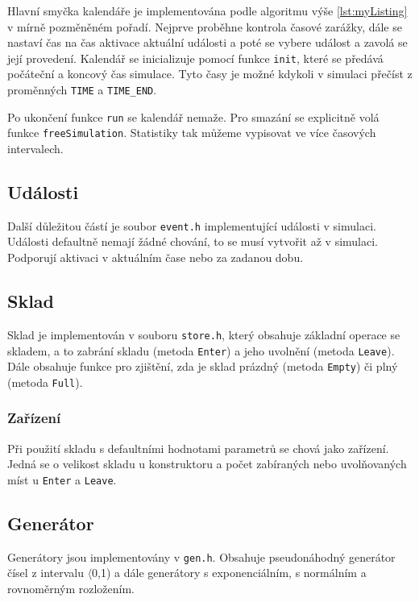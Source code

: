 \documentclass[12pt,a4paper,titlepage,final]{article}
\begin{document}
Hlavní smyčka kalendáře je implementována podle algoritmu výše \ref{lst:myListing} v mírně pozměněném pořadí. Nejprve proběhne kontrola časové zarážky, dále se nastaví čas na čas aktivace aktuální události a poté se vybere událost a zavolá se její provedení. Kalendář se inicializuje pomocí funkce \texttt{init}, které se předává počáteční a koncový čas simulace. Tyto časy je možné kdykoli v simulaci přečíst z proměnných \texttt{TIME} a \texttt{TIME\_END}.

Po ukončení funkce \texttt{run} se kalendář nemaže. Pro smazání se explicitně volá funkce \texttt{freeSimulation}. Statistiky tak můžeme vypisovat ve více časových intervalech.

\subsection{Události}

Další důležitou částí je soubor \texttt{event.h} implementující události v simulaci. Události defaultně nemají žádné chování, to se musí vytvořit až v simulaci. Podporují aktivaci v aktuálním čase nebo za zadanou dobu.

\subsection{Sklad}

Sklad je implementován v souboru \texttt{store.h}, který obsahuje základní operace se skladem, a to zabrání skladu (metoda \texttt{Enter}) a jeho uvolnění (metoda \texttt{Leave}). Dále obsahuje funkce pro zjištění, zda je sklad prázdný (metoda \texttt{Empty}) či plný (metoda \texttt{Full}). 
 
\subsubsection{Zařízení}
Při použití skladu s defaultními hodnotami parametrů se chová jako zařízení. Jedná se o velikost skladu u konstruktoru a počet zabíraných nebo uvolňovaných míst u \texttt{Enter} a \texttt{Leave}.

\subsection{Generátor}

Generátory jsou implementovány v \texttt{gen.h}. Obsahuje pseudonáhodný generátor čísel z intervalu $\langle$0,1) a dále generátory s exponenciálním, s normálním a rovnoměrným rozložením.
\end{document}
